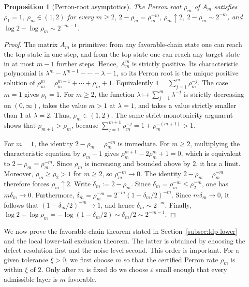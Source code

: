 \documentclass[11pt]{amsart}
\numberwithin{equation}{section}
\theoremstyle{plain}
\newtheorem{proposition}[theorem]{Proposition}
\theoremstyle{definition}
\theoremstyle{remark}
\begin{document}
\begin{proposition}[Perron-root asymptotics]\label{prop:perron-root-asymptotics}
The Perron root \(\rho_m\) of \(A_m\) satisfies \(\rho_1=1\), \(\rho_m\in(1,2)\) for every \(m\ge2\), \(2-\rho_m=\rho_m^{-m}\), \(\rho_m\uparrow2\), \(2-\rho_m\sim2^{-m}\), and \(\log 2-\log\rho_m\sim2^{-m-1}\).
\end{proposition}

\begin{proof}
The matrix \(A_m\) is primitive: from any favorable-chain state one can reach the top state in one step, and from the top state one can reach any target state in at most \(m-1\) further steps. Hence, \(A_m^m\) is strictly positive. Its characteristic polynomial is \(\lambda^m-\lambda^{m-1}-\cdots-\lambda-1\), so its Perron root is the unique positive solution of
\(
\rho_m^m=\rho_m^{m-1}+\cdots+\rho_m+1	\).
Equivalently
	\(1=\sum_{j=1}^m\rho_m^{-j}.
\)
The case \(m=1\) gives \(\rho_1=1\). For \(m\ge2\), the function \(\lambda\mapsto\sum_{j=1}^m\lambda^{-j}\) is strictly decreasing on \((0,\infty)\), takes the value \(m>1\) at \(\lambda=1\), and takes a value strictly smaller than \(1\) at \(\lambda=2\). Thus, \(\rho_m\in(1,2)\). The same strict-monotonicity argument shows that \(\rho_{m+1}>\rho_m\), because \(\sum_{j=1}^{m+1}\rho_m^{-j}=1+\rho_m^{-(m+1)}>1\).

For \(m=1\), the identity \(2-\rho_m=\rho_m^{-m}\) is immediate. For \(m\ge2\), multiplying the characteristic equation by \(\rho_m-1\) gives \(\rho_m^{m+1}-2\rho_m^m+1=0\), which is equivalent to \(2-\rho_m=\rho_m^{-m}\). Since \(\rho_m\) is increasing and bounded above by \(2\), it has a limit. Moreover, \(\rho_m\ge\rho_2>1\) for \(m\ge2\), so \(\rho_m^{-m}\to0\). The identity \(2-\rho_m=\rho_m^{-m}\) therefore forces \(\rho_m\uparrow2\).
Write \(\delta_m:=2-\rho_m\). Since \(\delta_m=\rho_m^{-m}\le\rho_2^{-m}\), one has \(m\delta_m\to0\). Furthermore,
\(
\delta_m=\rho_m^{-m}
=2^{-m}(1-\delta_m/2)^{-m}.
\)
Since \(m\delta_m\to0\), it follows that \((1-\delta_m/2)^{-m}\to1\), and hence \(\delta_m\sim2^{-m}\). Finally, \(\log 2-\log\rho_m=-\log(1-\delta_m/2)\sim\delta_m/2\sim2^{-m-1}\).
\end{proof}



We now prove the favorable-chain theorem stated in Section~\ref{subsec:ldp-lower} and  the local lower-tail exclusion theorem. The latter is obtained by choosing the defect resolution first and the noise level second. This order is important. For a given tolerance \(\xi>0\), we first choose \(m\) so that the certified Perron rate \(\rho_m\) is within \(\xi\) of \(2\). Only after \(m\) is fixed do we choose \(\varepsilon\) small enough that every admissible layer is \(m\)-favorable.
\end{document}
